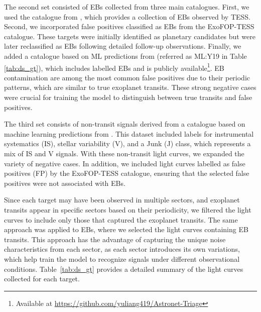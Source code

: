 The second set consisted of EBs collected from three main catalogues. First, we used the catalogue from \cite{prvsa2022tess}, which provides a collection of EBs observed by TESS. Second, we incorporated false positives classified as EBs from the ExoFOP-TESS catalogue. These targets were initially identified as planetary candidates but were later reclassified as EBs following detailed follow-up observations. Finally, we added a catalogue based on ML predictions from \citet{yu2019identifying}(referred as ML:Y19 in Table \ref{tab:ds_gt}), which includes labelled EBs and is publicly available\footnote{Available at \url{https://github.com/yuliang419/Astronet-Triage}}. EB contamination are among the most common false positives due to their periodic patterns, which are similar to true exoplanet transits. These strong negative cases were crucial for training the model to distinguish between true transits and false positives. \par

The third set consists of non-transit signals derived from a catalogue based on machine learning predictions from \citet{yu2019identifying}. This dataset included labels for instrumental systematics (IS), stellar variability (V), and a Junk (J) class, which represents a mix of IS and V signals. With these non-transit light curves, we expanded the variety of negative cases. In addition, we included light curves labelled as false positives (FP) by the ExoFOP-TESS catalogue, ensuring that the selected false positives were not associated with EBs. \par


Since each target may have been observed in multiple sectors, and exoplanet transits appear in specific sectors based on their periodicity, we filtered the light curves to include only those that captured the exoplanet transits. The same approach was applied to EBs, where we selected the light curves containing EB transits. This approach has the advantage of capturing the unique noise characteristics from each sector, as each sector introduces its own variations, which help train the model to recognize signals under different observational conditions. Table~\ref{tab:ds_gt} provides a detailed summary of the light curves collected for each target. \par


